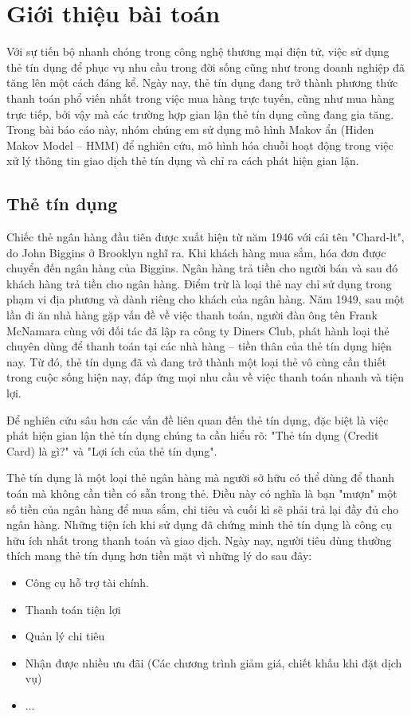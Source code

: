 \setcounter{chapter}{0}
\chapter{Giới thiệu bài toán}
Với sự tiến bộ nhanh chóng trong công nghệ thương mại điện tử, việc sử dụng thẻ tín dụng để phục vụ nhu cầu trong đời sống cũng như trong doanh nghiệp đã tăng lên một cách đáng kể. Ngày nay, thẻ tín dụng đang trở thành phương thức thanh toán phổ viến nhất trong việc mua hàng trực tuyến, cũng như mua hàng trực tiếp, bởi vậy mà các trường hợp gian lận thẻ tín dụng cũng đang gia tăng. Trong bài báo cáo này, nhóm chúng em sử dụng mô hình Makov ẩn (Hiden Makov Model – HMM) để nghiên cứu, mô hình hóa chuỗi hoạt động trong việc xử lý thông tin giao dịch thẻ tín dụng và chỉ ra cách phát hiện gian lận.
\section{Thẻ tín dụng}
Chiếc thẻ ngân hàng đầu tiên được xuất hiện từ năm 1946 với cái tên "Chard-lt", do John Biggins ở Brooklyn nghĩ ra. Khi khách hàng mua sắm, hóa đơn được chuyển đến ngân hàng của Biggins. Ngân hàng trả tiền cho người bán và sau đó khách hàng trả tiền cho ngân hàng. Điểm trừ là loại thẻ nay chỉ sử dụng trong phạm vi địa phương và dành riêng cho khách của ngân hàng. Năm 1949, sau một lần đi ăn nhà hàng gặp vấn đề về việc thanh toán, người đàn ông tên Frank McNamara cùng với đối tác đã lập ra công ty Diners Club, phát hành loại thẻ chuyên dùng để thanh toán tại các nhà hàng – tiền thân của thẻ tín dụng hiện nay. Từ đó, thẻ tín dụng đã và đang trở thành một loại thẻ vô cùng cần thiết trong cuộc sống hiện nay, đáp ứng mọi nhu cầu về việc thanh toán nhanh và tiện lợi. 

Để nghiên cứu sâu hơn các vấn đề liên quan đến thẻ tín dụng, đặc biệt là việc phát hiện gian lận thẻ tín dụng chúng ta cần hiểu rõ: "Thẻ tín dụng (Credit Card) là gì?" và "Lợi ích của thẻ tín dụng".

Thẻ tín dụng là một loại thẻ ngân hàng mà người sở hữu có thể dùng để thanh toán mà không cần tiền có sẵn trong thẻ. Điều này có nghĩa là bạn "mượn" một số tiền của ngân hàng để mua sắm, chi tiêu và cuối kì sẽ phải trả lại đầy đủ cho ngân hàng. Những tiện ích khi sử dụng đã chứng minh thẻ tín dụng là công cụ hữu ích nhất trong thanh toán và giao dịch. Ngày nay, người tiêu dùng thường thích mang thẻ tín dụng hơn tiền mặt vì những lý do sau đây:
\begin{itemize}
	\item Công cụ hỗ trợ tài chính.
	\item Thanh toán tiện lợi
	\item Quản lý chi tiêu
	\item Nhận được nhiều ưu đãi (Các chương trình giảm giá, chiết khấu khi đặt dịch vụ)
	\item ...
\end{itemize}

